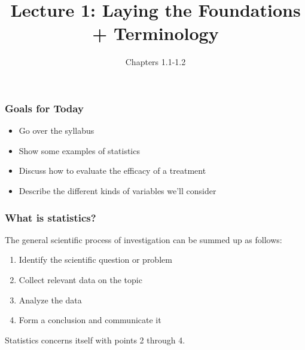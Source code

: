\documentclass[handout]{beamer}
\title{Lecture 1: Laying the Foundations + Terminology}
\author{Chapters 1.1-1.2}
\date{}
\newcommand{\blue}[1]{\textcolor{blue2}{#1}}
\begin{document}
\begin{frame}
\titlepage
\end{frame}


\begin{frame}
\frametitle{Goals for Today}
\begin{itemize}
  \item Go over the syllabus 
  \item Show some examples of statistics
  \item Discuss how to evaluate the efficacy of a \blue{treatment}
  \item Describe the different kinds of \blue{variables} we'll consider
\end{itemize}

\end{frame}


\begin{frame}
\frametitle{What is statistics?}

The general scientific process of investigation can be summed up as follows:

\begin{enumerate}
\pause\item Identify the scientific question or problem
\pause\item Collect relevant data on the topic
\pause\item Analyze the data
\pause\item Form a conclusion and communicate it
\end{enumerate}

\pause Statistics concerns itself with points 2 through 4.

\end{frame}
\end{document}

